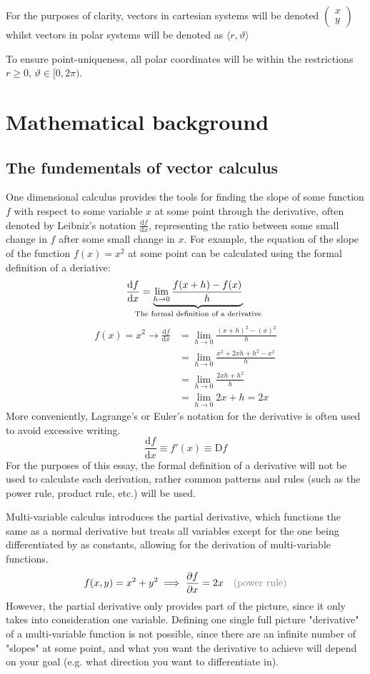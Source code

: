 \documentclass[a4paper,12pt]{article}
\renewcommand{\theta}{\vartheta}      		%
\newcommand{\der}[2]{\frac{\mathrm{d} #1}{\mathrm{d} #2}}           %
\newcommand{\partialder}[2]{\frac{\partial #1}{\partial #2}}        %
\newcommand{\justify}[1]{\text{\color{gray}(#1)}} 			%
\begin{document}
For the purposes of clarity, vectors in cartesian systems will be denoted $\begin{pmatrix}x\\y\end{pmatrix}$ whilst vectors in polar systems will be denoted as $\langle r,\theta\rangle$

To ensure point-uniqueness, all polar coordinates will be within the restrictions $r\geq0,\,\theta\in[0,2\pi)$.

\section{Mathematical background}
\subsection{The fundementals of vector calculus}
One dimensional calculus provides the tools for finding the slope of some function $f$ with respect to some variable $x$ at some point through the derivative, often denoted by Leibniz's notation $\der{f}{x}$, representing the ratio between some small change in $f$ after some small change in $x$. For example, the equation of the slope of the function $f(x)=x^2$ at some point can be calculated using the formal definition of a deriative:
\begin{equation}
	\der{f}{x}=\underbrace{\lim_{h\rightarrow0}\frac{f(x+h)-f(x)}{h}}_\text{\hidewidth The formal definition of a derivative\hidewidth}\\
\end{equation}
\begin{align*}
	f(x)=x^2\rightarrow\der{f}{x}&=\lim_{h\rightarrow0}\frac{(x+h)^2-(x)^2}{h}\\
	&=\lim_{h\rightarrow0}\frac{x^2+2xh+h^2-x^2}{h}\\
	&=\lim_{h\rightarrow0}\frac{2xh+h^2}{h}\\
	&=\lim_{h\rightarrow0}2x+h=2x
\end{align*}
More conveniently, Lagrange's or Euler's notation for the derivative is often used to avoid excessive writing.
$$\der{f}{x}\equiv f'(x)\equiv \mathrm{D}f$$
For the purposes of this essay, the formal definition of a derivative will not be used to calculate each derivation, rather common patterns and rules (such as the power rule, product rule, etc.) will be used. 

Multi-variable calculus introduces the partial derivative, which functions the same as a normal derivative but treats all variables except for the one being differentiated by as constants, allowing for the derivation of multi-variable functions.
\begin{align*}
	f(x,y)=x^2+y^2\implies\partialder{f}{x}=2x && \justify{power rule}
\end{align*}
However, the partial derivative only provides part of the picture, since it only takes into consideration one variable. Defining one single full picture "derivative" of a multi-variable function is not possible, since there are an infinite number of "slopes" at some point, and what you want the derivative to achieve will depend on your goal (e.g. what direction you want to differentiate in).
\end{document}
